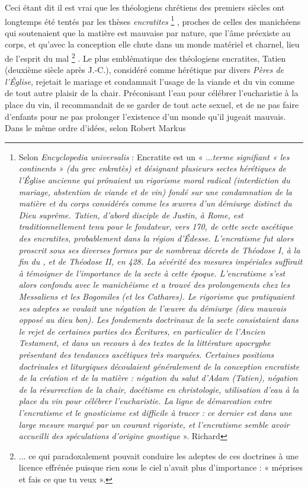  Ceci étant dit il est vrai que les théologiens chrétiens des premiers siècles ont longtemps été tentés par les thèses \emph{encratites}%
\footnote{Selon \emph{Encyclopedia universalis} : Encratite est un « ...\emph{terme signifiant « les continents » (du grec \emph{enkratès}) et désignant plusieurs sectes hérétiques de l'Église ancienne qui prônaient un rigorisme moral radical (interdiction du mariage, abstention de viande et de vin) fondé sur une condamnation de la matière et du corps considérés comme les œuvres d'un démiurge distinct du Dieu suprême. Tatien, d'abord disciple de Justin, à Rome, est traditionnellement tenu pour le fondateur, vers 170, de cette secte ascétique des encratites, probablement dans la région d'Édesse. L'encratisme fut alors proscrit sous ses diverses formes par de nombreux décrets de Théodose I\ier, à la fin du , et de Théodose II, en 428.
La sévérité des mesures impériales suffirait à témoigner de l'importance de la secte à cette époque. L'encratisme s'est alors confondu avec le manichéisme et a trouvé des prolongements chez les Messaliens et les Bogomiles (et les Cathares). Le rigorisme que pratiquaient ses adeptes se voulait une négation de l'œuvre du \emph{démiurge} (dieu mauvais opposé au dieu bon). Les fondements doctrinaux de la secte consistaient dans le rejet de certaines parties des Écritures, en particulier de l'Ancien Testament, et dans un recours à des textes de la littérature apocryphe présentant des tendances ascétiques très marquées. Certaines positions doctrinales et liturgiques découlaient généralement de la conception encratiste de la création et de la matière : négation du salut d'Adam (Tatien), négation de la résurrection de la chair, docétisme en christologie, utilisation d'eau à la place du vin pour célébrer l'eucharistie. La ligne de démarcation entre l'encratisme et le gnosticisme est difficile à tracer : ce dernier est dans une large mesure marqué par un courant rigoriste, et l'encratisme semble avoir accueilli des spéculations d'origine gnostique} ».
Richard }%
, proches de celles des manichéens qui soutenaient que la matière est mauvaise par nature, que l'âme préexiste au corps, et qu'avec la conception elle chute dans un monde matériel et charnel, lieu de l'esprit du mal
\footnote{... ce qui paradoxalement pouvait conduire les adeptes de ces doctrines à une licence effrénée puisque rien sous le ciel n'avait plus d'importance : « méprises et fais ce que tu veux ».}%
. Le plus emblématique des théologiens encratites, Tatien (deuxième siècle après J.-C.), considéré comme hérétique par divers \emph{Pères de l'Église}, rejetait le mariage et condamnait l'usage de la viande et du vin comme de tout autre plaisir de la chair. Préconisant l'eau pour célébrer l'eucharistie à la place du vin, il recommandait de se garder de tout acte sexuel, et de ne pas faire d'enfants pour ne pas prolonger l'existence d'un monde qu'il jugeait mauvais.  Dans le même ordre d'idées, selon Robert Markus%
